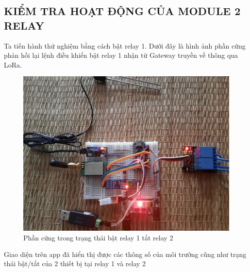 \subsection{KIỂM TRA HOẠT ĐỘNG CỦA MODULE 2 RELAY}
Ta tiến hành thử nghiệm bằng cách bật relay 1. Dưới đây là hình ảnh phần cứng phản hồi lại lệnh điều khiển bật relay 1 nhận từ Gateway truyền về thông qua LoRa.
\begin{figure}[H]
	\centering
	\includegraphics[scale=0.2]{Chapter 4/image chapter 4/R1ONR2OFF.jpg}
	\caption[Phần cứng trong trạng thái bật relay 1 tắt relay 2]{Phần cứng trong trạng thái bật relay 1 tắt relay 2}
	\label{hinh45}
\end{figure}
\indent Giao diện trên app đã hiển thị được các thông số của môi trường cũng như trạng thái bật/tắt của 2 thiết bị tại relay 1 và relay 2
